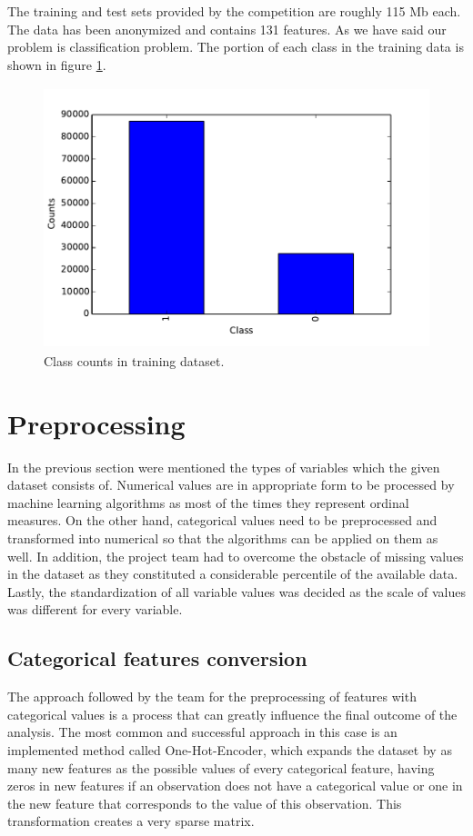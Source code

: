 \documentclass[conference, onecolumn]{IEEEtran}
\begin{document}
The training and test sets provided by the competition are roughly 115 Mb each. The data has been anonymized and contains 131 features. As we have said our problem is classification problem. The portion of each class in the training data is shown in figure \ref{fig_de1}.


\begin{figure}[ht]
\centering
\includegraphics[width=5in, height=3in]{plot_de1.pdf}
\caption{Class counts in training dataset.}
\label{fig_de1}
\end{figure}



\section{Preprocessing}
In the previous section were mentioned the types of variables which the given dataset consists of. Numerical values are in appropriate form to be processed by machine learning algorithms as most of the times they represent ordinal measures. On the other hand, categorical values need to be preprocessed and transformed into numerical so that the algorithms can be applied on them as well. In addition, the project team had to overcome the obstacle of missing values in the dataset as they constituted a considerable percentile of the available data. Lastly, the standardization of all variable values was decided as the scale of values was different for every variable. 

\subsection{Categorical features conversion}
The approach followed by the team for the preprocessing of features with categorical values is a process that can greatly influence the final outcome of the analysis. The most common and successful approach in this case is an implemented method called One-Hot-Encoder, which expands the dataset by as many new features as the possible values of every categorical feature, having zeros in new features if an observation does not have a categorical value or one in the new feature that corresponds to the value of this observation. This transformation creates a very sparse matrix.
\end{document}
